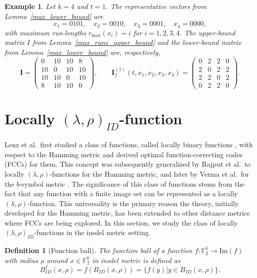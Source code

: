 \documentclass[11 pt]{article}
\numberwithin{equation}{section}
\newtheorem{definition}[theorem]{Definition}
\newtheorem{example}[theorem]{Example}
\begin{document}
    \begin{example}
    \label{ex:max-runlength-k4-t1}
    Let $k = 4$ and $t = 1$. The representative vectors from Lemma~\ref{max_lower_bound} are
    \[
    x_1 = 0101, \quad x_2 = 0010, \quad x_3 = 0001, \quad x_4 = 0000,
    \]
    with maximum run-lengths $r_{\max}(x_i) = i$ for $i = 1, 2, 3, 4$. The upper-bound matrix $I$ from Lemma~\ref{max_runs_upper_bound} and the lower-bound matrix from Lemma~\ref{max_lower_bound} are, respectively,
    \[
    \bm{I} = 
    \begin{pmatrix}
        0  & 10 & 10 & 8  \\
        10 & 0  & 10 & 10 \\
        10 & 10 & 0  & 10 \\
        8  & 10 & 10 & 0
    \end{pmatrix},
    \qquad
    \bm{I}^{(1)}_{f}(t, x_1, x_2, x_3, x_4) = 
    \begin{pmatrix}
        0 & 2 & 2 & 0 \\
        2 & 0 & 2 & 2 \\
        2 & 2 & 0 & 2 \\
        0 & 2 & 2 & 0
    \end{pmatrix}.
    \]


\end{example}
\section{Locally $(\lambda, \rho)_{ID}$-function}

    Lenz et al.\ first studied a class of functions, called locally binary functions \cite{10132545}, with respect to the Hamming metric and derived optimal function-correcting codes (FCCs) for them. This concept was subsequently generalized by Rajput et al.\ to {locally $(\lambda,\rho)$-functions}\cite{Rajput2025} for the Hamming metric, and later by Verma et al.\ for the $b$-symbol metric \cite{11250740}. The significance of this class of functions stems from the fact that any function with a finite image set can be represented as a locally $(\lambda,\rho)$-function. This universality is the primary reason the theory, initially developed for the Hamming metric, has been extended to other distance metrics where FCCs are being explored. In this section, we study the class of locally $(\lambda,\rho)_{ID}$-functions in the insdel metric setting.

    \begin{definition}[Function ball] The function ball of a function $f: \mathbb{F}_2^k \rightarrow \mathrm{Im}(f)$ with radius $\rho$ around $x \in \mathbb{F}_2^k$ in insdel metric is defined as $$ B_{ID}^f(x,\rho) = f(B_{ID}(x,\rho)) = \{f(y) | y \in B_{ID}(x,\rho)\}.$$    
    \end{definition}
\end{document}
